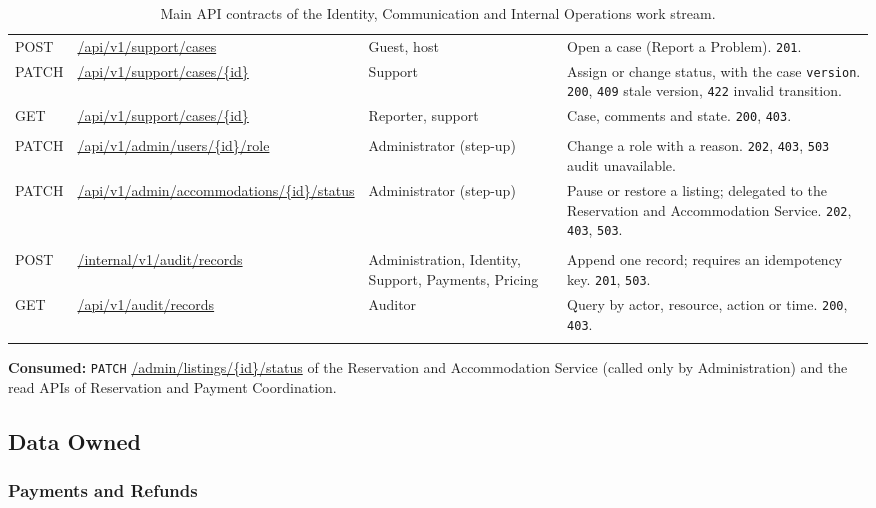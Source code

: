 \begin{longtable}{@{}L{1.8cm}L{4.4cm}L{2.5cm}L{5.1cm}@{}}
POST & \url{/api/v1/support/cases} & Guest, host &
  Open a case (Report a Problem). \texttt{201}. \\
PATCH & \url{/api/v1/support/cases/{id}} & Support &
  Assign or change status, with the case \texttt{version}. \texttt{200},
  \texttt{409} stale version, \texttt{422} invalid transition. \\
GET & \url{/api/v1/support/cases/{id}} & Reporter, support &
  Case, comments and state. \texttt{200}, \texttt{403}. \\
\addlinespace
{} \\
PATCH & \url{/api/v1/admin/users/{id}/role} & Admin\-istrator (step-up) &
  Change a role with a reason. \texttt{202}, \texttt{403}, \texttt{503}
  audit unavailable. \\
PATCH & \url{/api/v1/admin/accommodations/{id}/status} & Admin\-istrator (step-up) &
  Pause or restore a listing; delegated to the Reservation and Accommodation
  Service. \texttt{202}, \texttt{403}, \texttt{503}. \\
\addlinespace
{} \\
POST & \url{/internal/v1/audit/records} & Admin\-istration, Identity, Support,
  Payments, Pricing & Append one record; requires an idempotency key.
  \texttt{201}, \texttt{503}. \\
GET & \url{/api/v1/audit/records} & Auditor &
  Query by actor, resource, action or time. \texttt{200}, \texttt{403}. \\
\bottomrule
\caption{Main API contracts of the Identity, Communication and Internal
Operations work stream.}
\label{tab:id-api}
\end{longtable}

\noindent\textbf{Consumed:} \texttt{PATCH} \url{/admin/listings/{id}/status}
of the Reservation and Accommodation Service (called only by Administration)
and the read APIs of Reservation and Payment Coordination.
\endgroup

\subsection{Data Owned}


\subsubsection{Payments and Refunds}
\label{sec:pay-owned}

